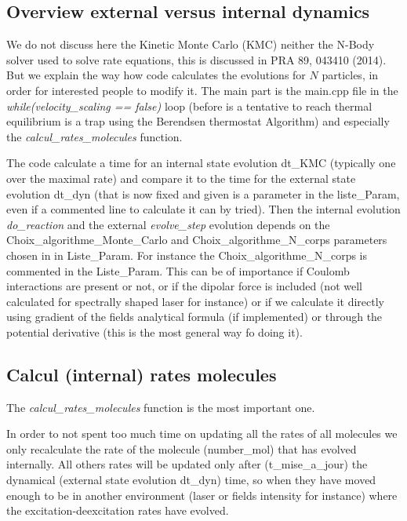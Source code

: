 \documentclass[amsmath,amssymb,nofootinbib]{revtex4-2}
\begin{document}
	\subsection{Overview external versus internal dynamics}
	
We do not discuss here the Kinetic Monte Carlo (KMC) neither the N-Body solver used to solve  rate equations, this is discussed in PRA 89, 043410 (2014).
But we explain the way how code calculates the evolutions for $N$ particles, in order for interested people to modify it. 
The main part is the main.cpp file in the
 \textit{ while(velocity\_scaling == false)}
loop (before is a tentative to reach thermal equilibrium is a trap using the Berendsen thermostat Algorithm) and especially the 
\textit{ calcul\_rates\_molecules}
function.

The code calculate a time for an internal state evolution dt\_KMC (typically one over the maximal rate) and compare it to the time for the external state evolution dt\_dyn (that is now fixed and given is a parameter in the liste\_Param, even if a commented line to calculate it can by tried). 
Then the internal evolution \textit{do\_reaction} and the external \textit{evolve\_step} evolution
depends on the Choix\_algorithme\_Monte\_Carlo and Choix\_algorithme\_N\_corps parameters chosen in in Liste\_Param. 
	For instance the Choix\_algorithme\_N\_corps is commented in the Liste\_Param. This can be of importance if Coulomb interactions are present or not, or if the dipolar force is included (not well calculated for spectrally shaped laser for instance) or if we calculate it directly using gradient of the fields analytical formula (if implemented) 
	or through the potential derivative (this is the most general way fo doing it). 
	
	\subsection{Calcul (internal) rates molecules}
	
The \textit{ calcul\_rates\_molecules}
function is the most important one.

In order to not spent too much time on updating all the rates of all molecules we only recalculate the rate of the molecule (number\_mol) that has evolved internally. All others rates will be updated only after (t\_mise\_a\_jour) the dynamical (external state evolution dt\_dyn) time, so when they have moved enough to be in another environment (laser or fields intensity for instance) where the excitation-deexcitation rates have evolved.
\end{document}
